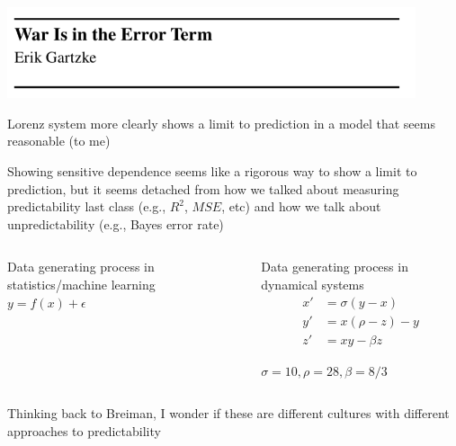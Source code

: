 \documentclass[aspectratio=169]{beamer}
\begin{document}
\begin{frame}

\begin{center}
\includegraphics[width = 0.9\textwidth]{figures/gartzke_war_1999_title}
\end{center}

\vfill
Lorenz system more clearly shows a limit to prediction in a model that seems reasonable (to me)

\end{frame}
\begin{frame}

Showing sensitive dependence seems like a rigorous way to show a limit to prediction, but it seems detached from how we talked about measuring predictability last class (e.g., $R^2$, $MSE$, etc) and how we talk about unpredictability (e.g., Bayes error rate)

\end{frame}
\begin{frame}

\begin{columns}[c]
  \begin{center}
  Data generating process in statistics/machine learning\\
  $y = f(x) + \epsilon$
  \end{center}
     \pause
   \begin{center}
  Data generating process in dynamical systems\\
\begin{align*}
  x' &= \sigma(y-x) \\
  y' &= x(\rho-z)-y \\
  z' &= xy-\beta z
\end{align*}
\begin{center}
$\sigma = 10, \rho = 28,  \beta = 8/3$ 
\end{center}
    \end{center}
\end{columns}

\vfill
Thinking back to Breiman, I wonder if these are different cultures with different approaches to predictability

\end{frame}
\end{document}
